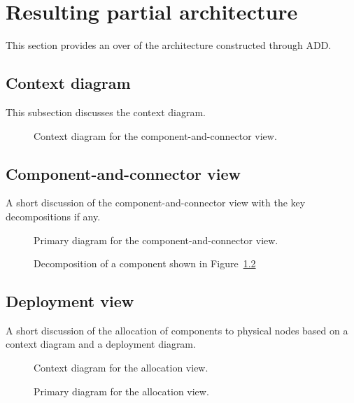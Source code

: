 \documentclass[english]{sareport}
\begin{document}
\chapter{Resulting partial architecture}\label{sec:architecture}
This section provides an over of the architecture constructed through ADD\@.

\section{Context diagram}
This subsection discusses the context diagram.

\begin{figure}[!htp]
	\centering
	\caption{Context diagram for the component-and-connector view.
	}\label{fig:cc_context}
\end{figure}

\section{Component-and-connector view}
A short discussion of the component-and-connector view with the key
decompositions if any.

\begin{figure}[!htp]
	\centering
	\caption{Primary diagram for the component-and-connector view.
	}\label{fig:cc_main}
\end{figure}

\begin{figure}[!htp]
	\centering
	\caption{Decomposition of a component shown in Figure~\ref{fig:cc_main}
	}\label{fig:decomp_decomp1}
\end{figure}

\section{Deployment view}
A short discussion of the allocation of components to physical nodes based on a
context diagram and a deployment diagram.

\begin{figure}[!htp]
	\centering
	\caption{Context diagram for the allocation view.}\label{fig:depl_context}
\end{figure}

\begin{figure}[!htp]
	\centering
	\caption{Primary diagram for the allocation view.}\label{fig:depl_main}
\end{figure}
\end{document}
